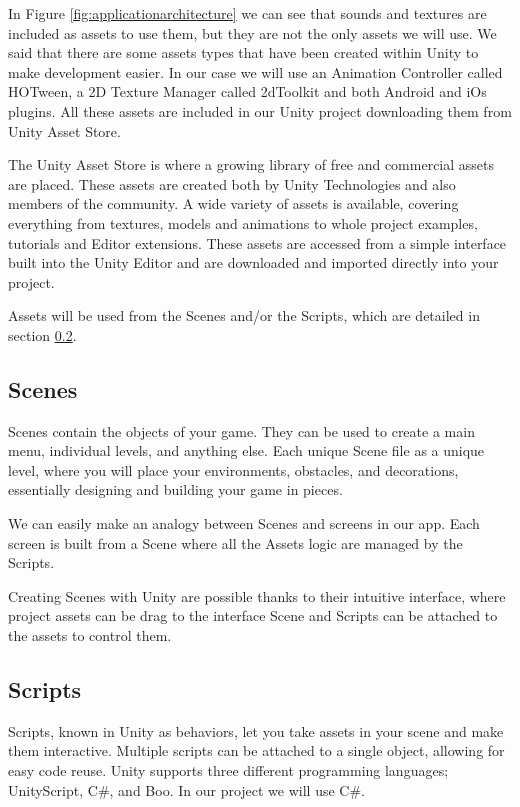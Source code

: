 In Figure \ref{fig:applicationarchitecture} we can see that sounds and textures are included as assets to use them, but they are not the only assets we will use. We said that there are some assets types that have been created within Unity to make development easier. In our case we will use an Animation Controller called HOTween, a 2D Texture Manager called 2dToolkit and both Android and iOs plugins. All these assets are included in our Unity project downloading them from Unity Asset Store.

The Unity Asset Store is where a growing library of free and commercial assets are placed. These assets are created both by Unity Technologies and also members of the community. A wide variety of assets is available, covering everything from textures, models and animations to whole project examples, tutorials and Editor extensions. These assets are accessed from a simple interface built into the Unity Editor and are downloaded and imported directly into your project.

Assets will be used from the Scenes and/or the Scripts, which are detailed in section \ref{subsec:unityscripts}.

\subsection{Scenes}
Scenes contain the objects of your game. They can be used to create a main menu, individual levels, and anything else. Each unique Scene file as a unique level, where you will place your environments, obstacles, and decorations, essentially designing and building your game in pieces.

We can easily make an analogy between Scenes and screens in our app. Each screen is built from a Scene where all the Assets logic are managed by the Scripts.

Creating Scenes with Unity are possible thanks to their intuitive interface, where project assets can be drag to the interface Scene and Scripts can be attached to the assets to control them.

\subsection{Scripts}
\label{subsec:unityscripts}
Scripts, known in Unity as behaviors, let you take assets in your scene and make them interactive. Multiple scripts can be attached to a single object, allowing for easy code reuse. Unity supports three different programming languages; UnityScript, C\#, and Boo. In our project we will use C\#.

